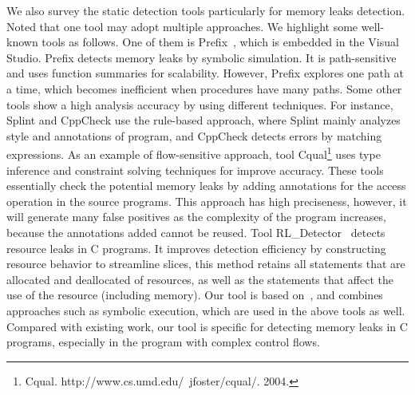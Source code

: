 We also survey the static detection tools particularly for memory leaks detection. Noted that one tool may adopt multiple approaches. We highlight some well-known tools as follows. One of them is Prefix~\cite{BPS00}, which is embedded in the Visual Studio. Prefix detects memory leaks by symbolic simulation. It is path-sensitive and uses function summaries for scalability. However, Prefix explores one path at a time, which becomes inefficient when procedures have many paths. %
Some other tools show a high analysis accuracy by using different techniques. For instance, Splint and CppCheck use the rule-based approach, where Splint mainly analyzes style and annotations of program, and CppCheck detects errors by matching expressions. As an example of flow-sensitive approach, tool Cqual\footnote{Cqual. http://www.cs.umd.edu/~jfoster/cqual/. 2004.} uses type inference and constraint solving techniques for improve accuracy. These tools essentially check the potential memory leaks by adding annotations for the access operation in the source programs. This approach has high preciseness, however, it will generate many false positives as the complexity of the program increases, because the annotations added cannot be reused. Tool RL\_Detector~\cite{J14} detects resource leaks in C programs. It improves detection efficiency by constructing resource behavior to streamline slices, this method retains all statements that are allocated and deallocated of resources, as well as the statements that affect the use of the resource (including memory). Our tool is based on~\cite{XA05}, and combines approaches such as symbolic execution, which are used in the above tools as well. Compared with existing work, our tool is specific for detecting memory leaks in C programs, especially in the program with complex control flows. 

